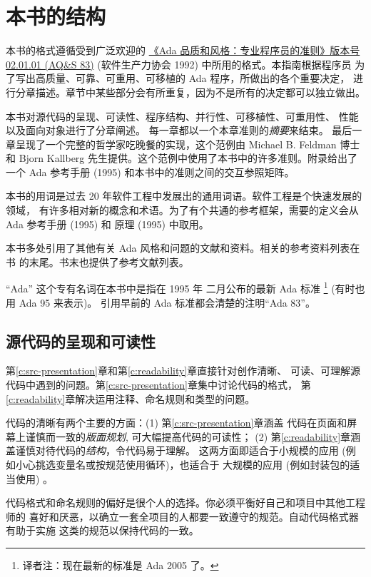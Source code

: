\section{本书的结构}
本书的格式遵循受到广泛欢迎的
\href{http://archive.adaic.com/docs/style-guide/83style/html/}
{《Ada 品质和风格：专业程序员的准则》版本号
 02.01.01 (AQ\&S 83)} (软件生产力协会 1992) 中所用的格式。本指南根据程序员
为了写出高质量、可靠、可重用、可移植的 Ada 程序，所做出的各个重要决定，
进行分章描述。章节中某些部分会有所重复，因为不是所有的决定都可以独立做出。

本书对源代码的呈现、可读性、程序结构、并行性、可移植性、可重用性、
性能以及面向对象进行了分章阐述。 每一章都以一个本章准则的\emph{摘要}来结束。
最后一章呈现了一个完整的哲学家吃晚餐的实现，这个范例由 Michael B. Feldman 博士
和 Bjorn Kallberg 先生提供。这个范例中使用了本书中的许多准则。附录给出了一个
Ada 参考手册 (1995) 和本书中的准则之间的交互参照矩阵。

本书的用词是过去 20 年软件工程中发展出的通用词语。软件工程是个快速发展的领域，
有许多相对新的概念和术语。为了有个共通的参考框架，需要的定义会从 Ada 参考手册
(1995) 和 原理 (1995) 中取用。

本书多处引用了其他有关 Ada 风格和问题的文献和资料。相关的参考资料列表在书
的末尾。书末也提供了参考文献列表。

``Ada'' 这个专有名词在本书中是指在 1995 年 二月公布的最新 Ada 标准
\footnote{译者注：现在最新的标准是 Ada 2005 了。} (有时也用 Ada 95 来表示)。
引用早前的 Ada 标准都会清楚的注明``Ada 83''。

\subsection{源代码的呈现和可读性}
第\ref{c:src-presentation}章和第\ref{c:readability}章直接针对创作清晰、
可读、可理解源代码中遇到的问题。第\ref{c:src-presentation}章集中讨论代码的格式，
第\ref{c:readability}章解决运用注释、命名规则和类型的问题。

代码的清晰有两个主要的方面：(1) 第\ref{c:src-presentation}章涵盖
代码在页面和屏幕上谨慎而一致的\emph{版面规划}, 可大幅提高代码的可读性；
(2) 第\ref{c:readability}章涵盖谨慎对待代码的\emph{结构}，令代码易于理解。
这两方面即适合于小规模的应用 (例如小心挑选变量名或按规范使用循环)，也适合于
大规模的应用 (例如封装包的适当使用) 。

代码格式和命名规则的偏好是很个人的选择。你必须平衡好自己和项目中其他工程师的
喜好和厌恶，以确立一套全项目的人都要一致遵守的规范。自动代码格式器有助于实施
这类的规范以保持代码的一致。

